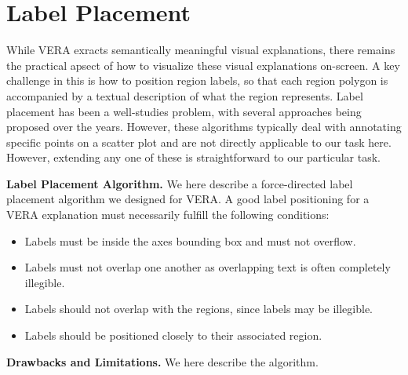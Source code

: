 \documentclass[10pt]{article}
\begin{document}
\appendix
\section{Label Placement}
\label{sec:label-placement}

While VERA exracts semantically meaningful visual explanations, there remains the practical apsect of how to visualize these visual explanations on-screen. A key challenge in this is how to position region labels, so that each region polygon is accompanied by a textual description of what the region represents.
Label placement has been a well-studies problem, with several approaches being proposed over the years. However, these algorithms typically deal with annotating specific points on a scatter plot and are not directly applicable to our task here.
However, extending any one of these is straightforward to our particular task.

\noindent \textbf{Label Placement Algorithm.} We here describe a force-directed label placement algorithm we designed for VERA. A good label positioning for a VERA explanation must necessarily fulfill the following conditions:
\begin{itemize}
  \item Labels must be inside the axes bounding box and must not overflow.
  \item Labels must not overlap one another as overlapping text is often completely illegible.
  \item Labels should not overlap with the regions, since labels may be illegible.
  \item Labels should be positioned closely to their associated region.
\end{itemize}

\noindent \textbf{Drawbacks and Limitations.} We here describe the algorithm.
\end{document}
